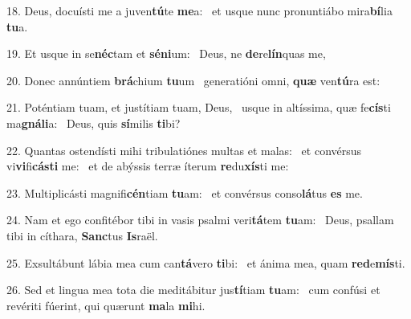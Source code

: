 18. Deus, docuísti me a juven\textbf{tú}te \textbf{me}a: \ast\  et usque nunc pronuntiábo mira\textbf{bí}lia \textbf{tu}a.\

19. Et usque in se\textbf{néc}tam et \textbf{sé}\textbf{ni}um: \ast\  Deus, ne \textbf{de}re\textbf{lín}quas me,\

20. Donec annúntiem \textbf{brá}chium \textbf{tu}um \ast\  generatióni omni, \textbf{quæ} ven\textbf{tú}ra est:\

21. Poténtiam tuam, et justítiam tuam, Deus, \dag\  usque in altíssima, quæ fe\textbf{cís}ti ma\textbf{gná}\textbf{li}a: \ast\  Deus, quis \textbf{sí}milis \textbf{ti}bi?\

22. Quantas ostendísti mihi tribulatiónes multas et malas: \dag\  et convérsus vi\textbf{vi}fi\textbf{cás}\textbf{ti} me: \ast\  et de abýssis terræ íterum \textbf{re}du\textbf{xís}ti me:\

23. Multiplicásti magnifi\textbf{cén}tiam \textbf{tu}am: \ast\  et convérsus conso\textbf{lá}tus \textbf{es} me.\

24. Nam et ego confitébor tibi in vasis psalmi veri\textbf{tá}tem \textbf{tu}am: \ast\  Deus, psallam tibi in cíthara, \textbf{Sanc}tus \textbf{Is}raël.\

25. Exsultábunt lábia mea cum can\textbf{tá}vero \textbf{ti}bi: \ast\  et ánima mea, quam \textbf{red}e\textbf{mís}ti.\

26. Sed et lingua mea tota die meditábitur jus\textbf{tí}tiam \textbf{tu}am: \ast\  cum confúsi et revériti fúerint, qui quærunt \textbf{ma}la \textbf{mi}hi.\


